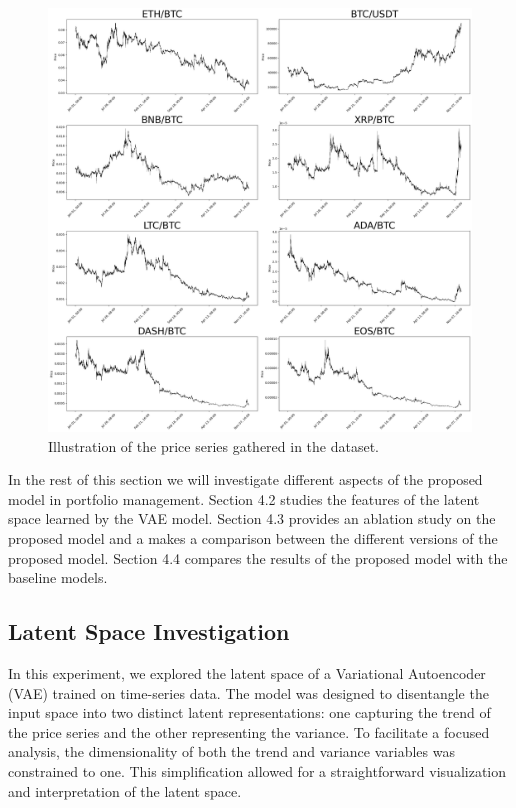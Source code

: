 \begin{figure}[H]
	\centering
	\includegraphics[scale=0.3]{./dataset.png}
	\caption{Illustration of the price series gathered in the dataset.}
	\label{fig:dataset}
\end{figure}



In the rest of this section we will investigate different aspects of the proposed model in portfolio management. Section 4.2 studies the features of the latent space learned by the VAE model. Section 4.3 provides an ablation study on the proposed model and a makes a comparison between the different versions of the proposed model. Section 4.4 compares the results of the proposed model with the baseline models.

\subsection{Latent Space Investigation}
In this experiment, we explored the latent space of a Variational Autoencoder (VAE) trained on time-series data. The model was designed to disentangle the input space into two distinct latent representations: one capturing the trend of the price series and the other representing the variance. To facilitate a focused analysis, the dimensionality of both the trend and variance variables was constrained to one. This simplification allowed for a straightforward visualization and interpretation of the latent space.

